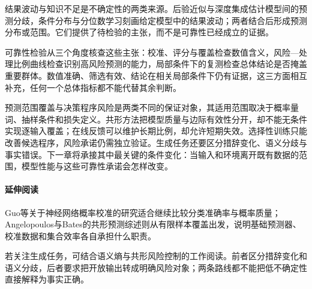 结果波动与知识不足是不确定性的两类来源。后验近似与深度集成估计模型间的预测分歧，条件分布与分位数学习刻画给定模型中的结果波动；两者结合后形成预测分布或范围。它们提供了待检验的主张，而不是可靠性已经成立的证据。

可靠性检验从三个角度核查这些主张：校准、评分与覆盖检查数值含义，风险—处理比例曲线检查识别高风险预测的能力，局部条件下的复测检查总体结论是否掩盖重要群体。数值准确、筛选有效、结论在相关局部条件下仍有证据，这三方面相互补充，任何一个总体指标都不能代替其余判断。

预测范围覆盖与决策程序风险是两类不同的保证对象，其适用范围取决于概率量词、抽样条件和损失定义。共形方法把模型质量与边际有效性分开，却不能无条件实现逐输入覆盖；在线反馈可以维护长期比例，却允许短期失效。选择性训练只能改善候选程序，风险承诺仍需独立验证。生成任务还要区分措辞变化、语义分歧与事实错误。下一章将承接其中最关键的条件变化：当输入和环境离开既有数据的范围，模型性能与这些可靠性承诺会怎样改变。

\paragraph{延伸阅读}

Guo等关于神经网络概率校准的研究适合继续比较分类准确率与概率质量；Angelopoulos与Bates的共形预测综述则从有限样本覆盖出发，说明基础预测器、校准数据和集合效率各自承担什么职责。

若关注生成任务，可结合语义熵与共形风险控制的工作阅读。前者区分措辞变化和语义分歧，后者要求把开放输出转成明确风险对象；两条路线都不能把低不确定性直接解释为事实正确。
